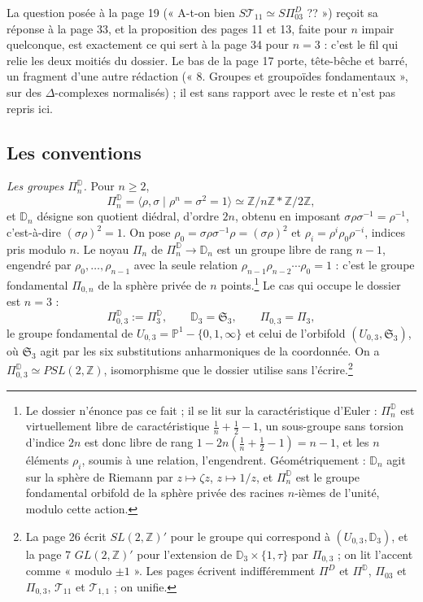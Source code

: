 \documentclass[11pt,a4paper]{article}
\begin{document}
La question posée à la page 19 (« A-t-on bien $S\mathcal{T}_{11} \simeq
S\Pi^{D}_{03}$ ?? ») reçoit sa réponse à la page 33, et la proposition des
pages 11 et 13, faite pour $n$ impair quelconque, est exactement ce qui sert à la
page 34 pour $n = 3$ : c'est le fil qui relie les deux moitiés du dossier. Le
bas de la page 17 porte, tête-bêche et barré, un fragment d'une autre rédaction
(« 8. Groupes et groupoïdes fondamentaux », sur des $\Delta$-complexes
normalisés) ; il est sans rapport avec le reste et n'est pas repris ici.

\subsection*{Les conventions}

\emph{Les groupes $\Pi^{\mathbb{D}}_n$.} Pour $n \geqslant 2$,
\[
\Pi^{\mathbb{D}}_n = \langle \rho, \sigma \mid \rho^n = \sigma^2 = 1 \rangle
\simeq \mathbb{Z}/n\mathbb{Z} * \mathbb{Z}/2\mathbb{Z} ,
\]
et $\mathbb{D}_n$ désigne son quotient diédral, d'ordre $2n$, obtenu en imposant
$\sigma\rho\sigma^{-1} = \rho^{-1}$, c'est-à-dire $(\sigma\rho)^2 = 1$. On pose
$\rho_0 = \sigma\rho\sigma^{-1}\rho = (\sigma\rho)^2$ et
$\rho_i = \rho^i \rho_0 \rho^{-i}$, indices pris modulo $n$. Le noyau $\Pi_n$ de
$\Pi^{\mathbb{D}}_n \to \mathbb{D}_n$ est un groupe libre de rang $n - 1$,
engendré par $\rho_0, \dots, \rho_{n-1}$ avec la seule relation
$\rho_{n-1}\rho_{n-2}\cdots\rho_0 = 1$ : c'est le groupe fondamental
$\Pi_{0,n}$ de la sphère privée de $n$ points.\footnote{Le dossier n'énonce pas
ce fait ; il se lit sur la caractéristique d'Euler : $\Pi^{\mathbb{D}}_n$ est
virtuellement libre de caractéristique $\frac1n + \frac12 - 1$, un sous-groupe
sans torsion d'indice $2n$ est donc libre de rang $1 - 2n(\frac1n + \frac12 - 1)
= n - 1$, et les $n$ éléments $\rho_i$, soumis à une relation, l'engendrent.
Géométriquement : $\mathbb{D}_n$ agit sur la sphère de Riemann par
$z \mapsto \zeta z$, $z \mapsto 1/z$, et $\Pi^{\mathbb{D}}_n$ est le groupe
fondamental orbifold de la sphère privée des racines $n$-ièmes de l'unité,
modulo cette action.} Le cas qui occupe le dossier est $n = 3$ :
\[
\Pi^{\mathbb{D}}_{0,3} := \Pi^{\mathbb{D}}_3, \qquad
\mathbb{D}_3 = \mathfrak{S}_3, \qquad \Pi_{0,3} = \Pi_3 ,
\]
le groupe fondamental de $U_{0,3} = \mathbb{P}^1 - \{0, 1, \infty\}$ et celui de
l'orbifold $(U_{0,3}, \mathfrak{S}_3)$, où $\mathfrak{S}_3$ agit par les six
substitutions anharmoniques de la coordonnée. On a
$\Pi^{\mathbb{D}}_{0,3} \simeq PSL(2, \mathbb{Z})$, isomorphisme que le dossier
utilise sans l'écrire.\footnote{La page 26 écrit $SL(2, \mathbb{Z})'$ pour le
groupe qui correspond à $(U_{0,3}, \mathbb{D}_3)$, et la page 7
$GL(2, \mathbb{Z})'$ pour l'extension de $\mathbb{D}_3 \times \{1, \tau\}$ par
$\Pi_{0,3}$ ; on lit l'accent comme « modulo $\pm 1 $ ». Les pages écrivent
indifféremment $\Pi^{D}$ et $\Pi^{\mathbb{D}}$, $\Pi_{03}$ et $\Pi_{0,3}$,
$\mathcal{T}_{11}$ et $\mathcal{T}_{1,1}$ ; on unifie.}
\end{document}
